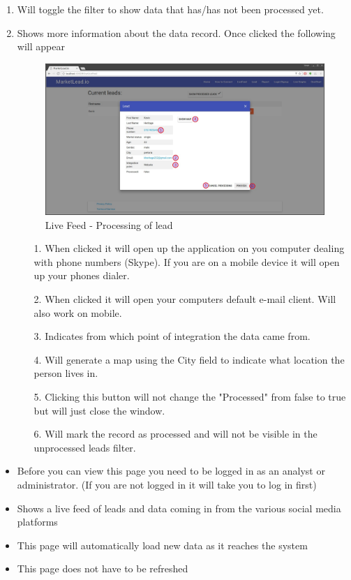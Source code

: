 \documentclass{article}
\begin{document}
			\begin{enumerate}
				\item Will toggle the filter to show data that has/has not been processed yet.
				\item Shows more information about the data record. Once clicked the following will appear
					\begin{figure}[H]
						\includegraphics[width=\textwidth]{images/live_feed_process.jpg}
						\caption{Live Feed - Processing of lead}
					\end{figure}

					\begin{itemize}
						\item[1.] When clicked it will open up the application on you computer dealing with phone numbers (Skype). If you are on a mobile device it will open up your phones dialer.
						\item[2.] When clicked it will open your computers default e-mail client. Will also work on mobile.
						\item[3.] Indicates from which point of integration the data came from.
						\item[4.] Will generate a map using the City field to indicate what location the person lives in.
						\item[5.] Clicking this button will not change the "Processed" from false to true but will just close the window.
						\item[6.] Will mark the record as processed and will not be visible in the unprocessed leads filter.
					\end{itemize}
			\end{enumerate}

			\begin{itemize}
				\item Before you can view this page you need to be logged in as an analyst or administrator. (If you are not logged in it will take you to log in first)
				\item Shows a live feed of leads and data coming in from the various social media platforms
				\item This page will automatically load new data as it reaches the system
				\item This page does not have to be refreshed
			\end{itemize}
\end{document}

